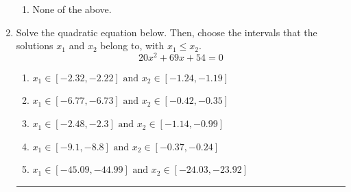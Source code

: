 \documentclass[14pt]{extbook}
\newcommand{\litem}[1]{\item#1\hspace*{-1cm}\rule{\textwidth}{0.4pt}}
\begin{document}
\begin{enumerate}
{\begin{enumerate}[label=\Alph*.]
\item None of the above.
\end{enumerate} }
\litem{
Solve the quadratic equation below. Then, choose the intervals that the solutions $x_1$ and $x_2$ belong to, with $x_1 \leq x_2$.\[ 20x^{2} +69 x + 54 = 0 \]\begin{enumerate}[label=\Alph*.]
\item \( x_1 \in [-2.32, -2.22] \text{ and } x_2 \in [-1.24, -1.19] \)
\item \( x_1 \in [-6.77, -6.73] \text{ and } x_2 \in [-0.42, -0.35] \)
\item \( x_1 \in [-2.48, -2.3] \text{ and } x_2 \in [-1.14, -0.99] \)
\item \( x_1 \in [-9.1, -8.8] \text{ and } x_2 \in [-0.37, -0.24] \)
\item \( x_1 \in [-45.09, -44.99] \text{ and } x_2 \in [-24.03, -23.92] \)

\end{enumerate} }
\end{enumerate}
\end{document}
